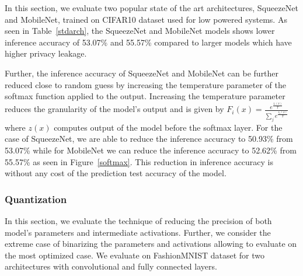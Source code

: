 In this section, we evaluate two popular state of the art architectures, SqueezeNet and MobileNet, trained on CIFAR10 dataset used for low powered systems.
As seen in Table~\ref{stdarch}, the SqueezeNet and MobileNet models shows lower inference accuracy of 53.07\% and 55.57\% compared to larger models which have higher privacy leakage.



Further, the inference accuracy of SqueezeNet and MobileNet can be further reduced close to random guess by increasing the temperature parameter of the softmax function applied to the output.
Increasing the temperature parameter reduces the granularity of the model's output and is given by $F_i(x) = \frac{e^{\frac{z_i(x)}{T}}}{\sum_{j}e^{\frac{z_j(x)}{T}}}$ where $z(x)$ computes output of the model before the softmax layer.
For the case of SqueezeNet, we are able to reduce the inference accuracy to 50.93\% from 53.07\% while for MobileNet we can reduce the inference accuracy to 52.62\% from 55.57\% as seen in Figure~\ref{softmax}.
This reduction in inference accuracy is without any cost of the prediction test accuracy of the model.




\subsubsection{Quantization}

In this section, we evaluate the technique of reducing the precision of both model's parameters and intermediate activations.
Further, we consider the extreme case of binarizing the parameters and activations allowing to evaluate on the most optimized case.
We evaluate on FashionMNIST dataset for two architectures with convolutional and fully connected layers.

